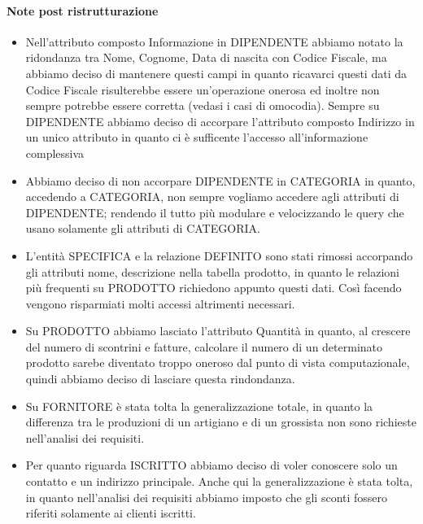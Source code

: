 \paragraph*{Note post ristrutturazione}
\begin{itemize}

\item Nell'attributo composto Informazione in DIPENDENTE abbiamo notato la ridondanza tra Nome, Cognome, Data di nascita con Codice Fiscale, ma abbiamo deciso di mantenere questi campi in quanto ricavarci questi dati da Codice Fiscale risulterebbe essere un'operazione onerosa ed inoltre non sempre potrebbe essere corretta (vedasi i casi di omocodia). Sempre su DIPENDENTE abbiamo deciso di accorpare l'attributo composto Indirizzo in un unico attributo in quanto ci \`e sufficente l'accesso all'informazione complessiva

\item Abbiamo deciso di non accorpare DIPENDENTE in CATEGORIA in quanto, accedendo a CATEGORIA, non sempre vogliamo accedere agli attributi di DIPENDENTE; rendendo il tutto pi\`u modulare e velocizzando le query che usano solamente gli attributi di CATEGORIA.

\item L'entit\`a SPECIFICA e la relazione DEFINITO sono stati rimossi accorpando gli attributi nome, descrizione nella tabella prodotto, in quanto le relazioni pi\`u frequenti su PRODOTTO richiedono appunto questi dati. Cos\`i facendo vengono risparmiati molti accessi altrimenti necessari.

\item Su PRODOTTO abbiamo lasciato l'attributo Quantit\`a in quanto, al crescere del numero di scontrini e fatture, calcolare il numero di un determinato prodotto sarebe diventato troppo oneroso dal punto di vista computazionale, quindi abbiamo deciso di lasciare questa rindondanza.

\item Su FORNITORE \`e stata tolta la generalizzazione totale, in quanto la differenza tra le produzioni di un artigiano e di un grossista non sono richieste nell'analisi dei requisiti.

\item Per quanto riguarda ISCRITTO abbiamo deciso di voler conoscere solo un contatto e un indirizzo principale. Anche qui la generalizzazione \`e stata tolta, in quanto nell'analisi dei requisiti abbiamo imposto che gli sconti fossero riferiti solamente ai clienti iscritti.
  
\end{itemize}
